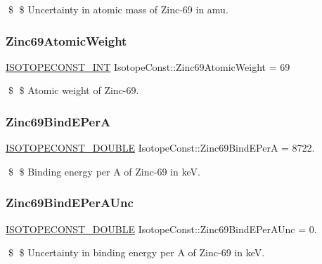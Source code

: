 \$ \$ Uncertainty in atomic mass of Zinc-\/69 in amu. \mbox{\label{group___isotope_const-_zinc-_zn69_ga2e53b82c9bf4c89fd1a258ec42f9cd38}} 
\subsubsection{\texorpdfstring{Zinc69\+Atomic\+Weight}{Zinc69AtomicWeight}}
{\footnotesize\ttfamily \mbox{\hyperlink{group___isotope_const-_macros_ga5f18360b3e99483a35c32d789e62621c}{I\+S\+O\+T\+O\+P\+E\+C\+O\+N\+S\+T\+\_\+\+I\+NT}} Isotope\+Const\+::\+Zinc69\+Atomic\+Weight = 69}

\$ \$ Atomic weight of Zinc-\/69. \mbox{\label{group___isotope_const-_zinc-_zn69_ga139ac217dd76902ac8c2ef0a0d50375b}} 
\subsubsection{\texorpdfstring{Zinc69\+Bind\+E\+PerA}{Zinc69BindEPerA}}
{\footnotesize\ttfamily \mbox{\hyperlink{group___isotope_const-_macros_ga8f45a7272ce02c0b4c65c44636ed719a}{I\+S\+O\+T\+O\+P\+E\+C\+O\+N\+S\+T\+\_\+\+D\+O\+U\+B\+LE}} Isotope\+Const\+::\+Zinc69\+Bind\+E\+PerA = 8722.}

\$ \$ Binding energy per A of Zinc-\/69 in keV. \mbox{\label{group___isotope_const-_zinc-_zn69_ga2625bf8d3e0cf9d022e7da1802f695f1}} 
\subsubsection{\texorpdfstring{Zinc69\+Bind\+E\+Per\+A\+Unc}{Zinc69BindEPerAUnc}}
{\footnotesize\ttfamily \mbox{\hyperlink{group___isotope_const-_macros_ga8f45a7272ce02c0b4c65c44636ed719a}{I\+S\+O\+T\+O\+P\+E\+C\+O\+N\+S\+T\+\_\+\+D\+O\+U\+B\+LE}} Isotope\+Const\+::\+Zinc69\+Bind\+E\+Per\+A\+Unc = 0.}

\$ \$ Uncertainty in binding energy per A of Zinc-\/69 in keV. \mbox{\label{group___isotope_const-_zinc-_zn69_ga0ae9b01e6e2293f0242c58c68faedaa6}} 
